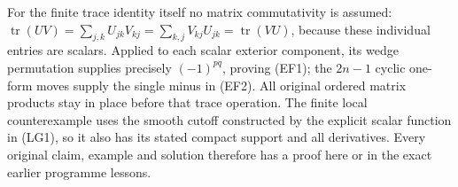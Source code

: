 \documentclass[
  11pt,
]{article}
\begin{document}
For the finite trace identity itself no matrix commutativity is assumed:
\(\operatorname{tr}(UV)=\sum_{j,k}U_{jk}V_{kj}=\sum_{k,j}V_{kj}U_{jk}=\operatorname{tr}(VU)\),
because these individual entries are scalars. Applied to each scalar
exterior component, its wedge permutation supplies precisely
\((-1)^{pq}\), proving (EF1); the \(2n-1\) cyclic one-form moves supply
the single minus in (EF2). All original ordered matrix products stay in
place before that trace operation. The finite local counterexample uses
the smooth cutoff constructed by the explicit scalar function in (LG1),
so it also has its stated compact support and all derivatives. Every
original claim, example and solution therefore has a proof here or in
the exact earlier programme lessons.
\end{document}
